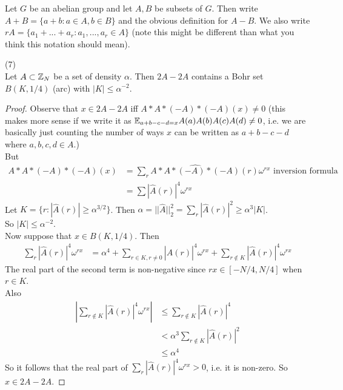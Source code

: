 \documentclass[a4paper]{article}
\begin{document}
\begin{defi}
    Let $G$ be an abelian group and let $A,B$ be subsets of $G$. Then write $A + B = \{a+b: a \in A, b \in B\}$ and the obvious definition for $A-B$. We also write $rA = \{a_1+...+a_r:a_1,...,a_r\in A\}$ (note this might be different than what you think this notation should mean).
\end{defi}

\begin{lemma} (7)\\
    Let $A \subset \mathbb{Z}_N$ be a set of density $\alpha$. Then $2A-2A$ contains a Bohr set $B(K,1/4)$ (arc) with $|K| \leq \alpha^{-2}$.
    \begin{proof}
        Observe that $x \in 2A-2A$ iff $A*A*(-A)*(-A)(x) \neq 0$ (this makes more sense if we write it as $\mathbb{E}_{a+b-c-d=x} A(a)A(b)A(c)A(d) \neq 0$, i.e. we are basically just counting the number of ways $x$ can be written as $a+b-c-d$ where $a,b,c,d \in A$.)\\
        But
        \begin{equation*}
            \begin{aligned}
                A*A*(-A)*(-A)(x) &= \sum_r \widehat{A*A*(-A)*(-A)}(r) \omega^{rx} \text{ inversion formula}\\
                &= \sum |\hat{A}(r)|^4 \omega^{rx}
            \end{aligned}
        \end{equation*}
        Let $K = \{r: |\hat{A}(r)| \geq \alpha^{3/2}\}$. Then $\alpha = ||\hat{A}||_2^2 = \sum_r |\hat{A}(r)|^2 \geq \alpha^3 |K|$.\\
        So $|K| \leq \alpha^{-2}$.\\
        Now suppose that $x \in B(K,1/4)$. Then
        \begin{equation*}
            \begin{aligned}
                \sum_r |\hat{A}(r)|^4 \omega^{rx} &= \alpha^4 + \sum_{r \in K, r \neq 0} |\hat{A}(r)|^4 \omega^{rx} + \sum_{r \not\in K} |\hat{A}(r)|^4 \omega^{rx}
            \end{aligned}
        \end{equation*}
        The real part of the second term is non-negative since $rx \in [-N/4,N/4]$ when $r \in K$.\\
        Also 
        \begin{equation*}
            \begin{aligned}
                \left|\sum_{r \not\in K} |\hat{A}(r)|^4 \omega^{rx}\right| &\leq \sum_{r \not\in K} |\hat{A}(r)|^4\\
                &< \alpha^3 \sum_{r \not\in K} |\hat{A}(r)|^2\\
                &\leq \alpha^4
            \end{aligned}
        \end{equation*}
        So it follows that the real part of $\sum_r |\hat{A}(r)|^4 \omega^{rx} > 0$, i.e. it is non-zero. So $x \in 2A - 2A$.
    \end{proof}
\end{lemma}
\end{document}
